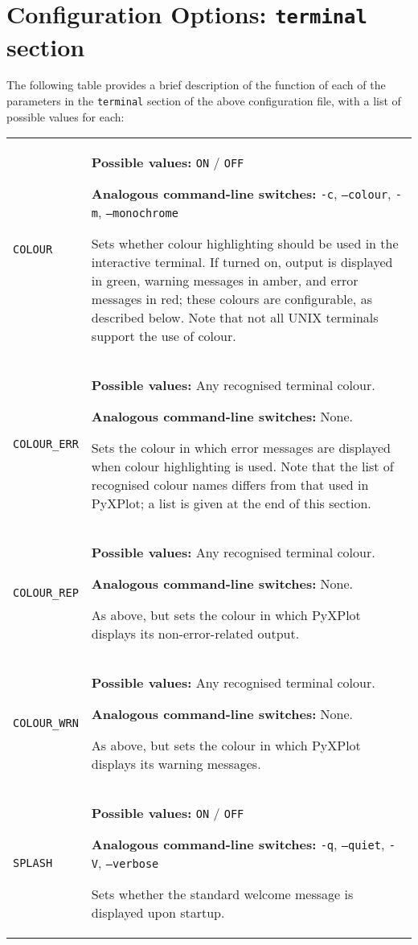 \section{Configuration Options: {\tt terminal} section}
\label{configfile_terminal}

The following table provides a brief description of the function of each of the
parameters in the {\tt terminal} section of the above configuration file,
with a list of possible values for each:

\begin{longtable}{p{3.4cm}p{9cm}}
{\tt COLOUR} & {\bf Possible values:} {\tt ON} / {\tt OFF}

               {\bf Analogous command-line switches:} {\tt -c}, {\tt --colour}, {\tt -m}, {\tt --monochrome}

               Sets whether colour highlighting should be used in the interactive terminal. If turned on, output is displayed in green, warning messages in amber, and error messages in red; these colours are configurable, as described below. Note that not all UNIX terminals support the use of colour.
               \\
{\tt COLOUR\_ERR} & {\bf Possible values:} Any recognised terminal colour.

               {\bf Analogous command-line switches:} None.

               Sets the colour in which error messages are displayed when colour highlighting is used. Note that the list of recognised colour names differs from that used in PyXPlot; a list is given at the end of this section.
               \\
{\tt COLOUR\_REP} & {\bf Possible values:} Any recognised terminal colour.

               {\bf Analogous command-line switches:} None.

               As above, but sets the colour in which PyXPlot displays its non-error-related output.
               \\
{\tt COLOUR\_WRN} & {\bf Possible values:} Any recognised terminal colour.

               {\bf Analogous command-line switches:} None.

               As above, but sets the colour in which PyXPlot displays its warning messages.
               \\
{\tt SPLASH} & {\bf Possible values:} {\tt ON} / {\tt OFF}

               {\bf Analogous command-line switches:} {\tt -q}, {\tt --quiet}, {\tt -V}, {\tt --verbose}

               Sets whether the standard welcome message is displayed upon startup.
               \\
\end{longtable}


